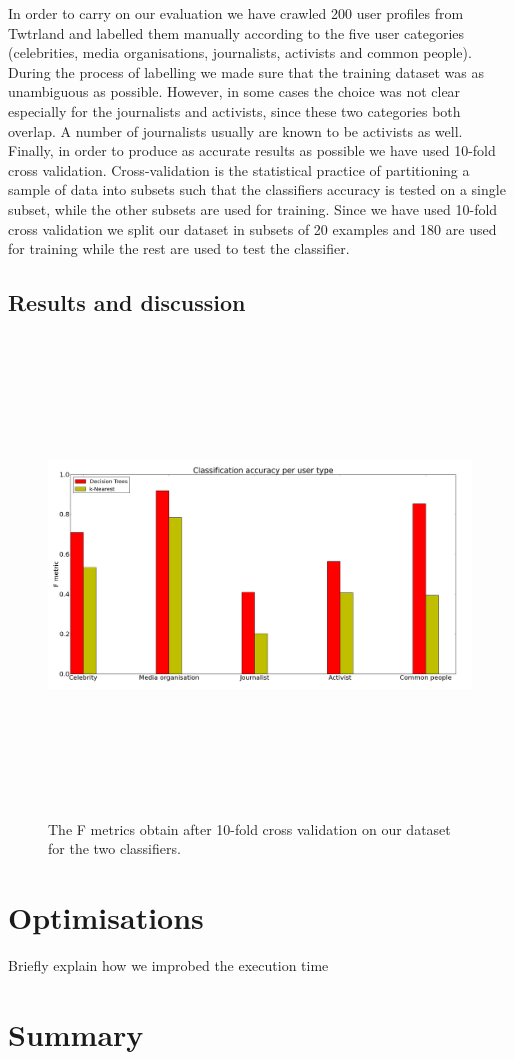 In order to carry on our evaluation we have crawled 200 user profiles from Twtrland and labelled them manually according to the five user categories (celebrities, media organisations, journalists, activists and common people). During the process of labelling we made sure that the training dataset was as unambiguous as possible. However, in some cases the choice was not clear especially for the journalists and activists, since these two categories both overlap. A number of journalists usually are known to be activists as well. Finally, in order to produce as accurate results as possible we have used 10-fold cross validation. Cross-validation is the statistical practice of partitioning a sample of data into subsets such that the classifiers accuracy is tested on a single subset, while the other subsets are used for training. Since we have used 10-fold cross validation we split our dataset in subsets of 20 examples and 180 are used for training while the rest are used to test the classifier.

\subsection{Results and discussion}

\begin{figure}[htbp]
  \begin{center}
    \includegraphics[height=5in, width=6in]{classifiers}
    \caption{The F metrics obtain after 10-fold cross validation on our dataset for the two classifiers.}
    \label{DifferenClassifiersResults}
  \end{center}
\end{figure}


\section{Optimisations}
Briefly explain how we improbed the execution time

\section{Summary}



